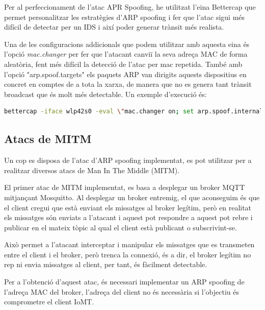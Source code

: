 Per al perfeccionament de l'atac APR Spoofing, he utilitzat l'eina Bettercap que permet personalitzar les estratègies d'ARP spoofing i fer que l'atac sigui més difícil de detectar per un IDS i així poder generar trànsit més realista. 

Una de les configuracions addicionals que podem utilitzar amb aquesta eina és l'opció \textit{mac.changer} per fer que l'atacant canviï la seva adreça MAC de forma aleatòria, fent més difícil la detecció de l'atac per mac repetida. També amb l'opció "arp.spoof.targets" els paquets ARP van dirigits aquests dispositius en concret en comptes de a tota la xarxa, de manera que no es genera tant trànsit broadcast que és molt més detectable. Un exemple d'execució és:

\begin{lstlisting}[language=bash, caption={Execució Bettercap}, label=lst:bettercap]
bettercap -iface wlp42s0 -eval \"mac.changer on; set arp.spoof.internal true; set arp.spoof.targets 192.168.0.41,192.168.0.40; arp.spoof on\"
\end{lstlisting}

\subsection{Atacs de MITM}
\label{sec:MITM}
Un cop es disposa de l'atac d'ARP spoofing implementat, es pot utilitzar per a realitzar diversos atacs de Man In The Middle (MITM). 

El primer atac de MITM implementat, es basa a desplegar un broker MQTT mitjançant Mosquitto. Al desplegar un broker entremig, el que aconseguim és que el client cregui que està enviant els missatges al broker legítim, però en realitat els missatges són enviats a l'atacant i aquest pot respondre a aquest pot rebre i publicar en el mateix tòpic al qual el client està publicant o subscrivint-se.

Això permet a l'atacant interceptar i manipular els missatges que es transmeten entre el client i el broker, però trenca la connexió, és a dir, el broker legítim no rep ni envia missatges al client, per tant, és fàcilment detectable.

Per a l'obtenció d'aquest atac, és necessari implementar un ARP spoofing de l'adreça MAC del broker, l'adreça del client no és necessària si l'objectiu és comprometre el client IoMT. 

